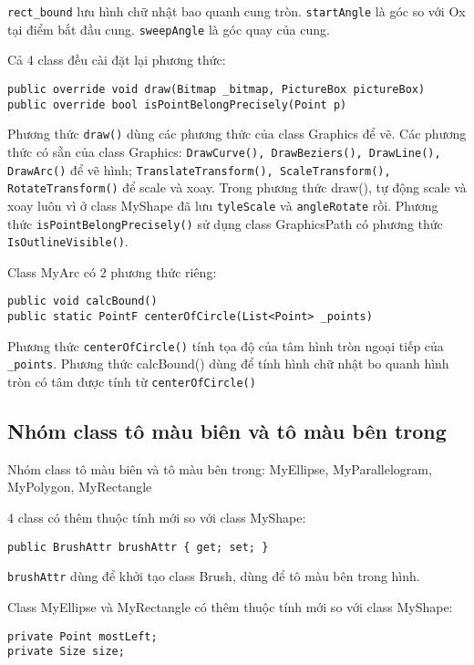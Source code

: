 \documentclass[12pt]{article}
\begin{document}
\texttt{rect\_bound} lưu hình chữ nhật bao quanh cung tròn.
\texttt{startAngle} là góc so với Ox tại điểm bắt đầu cung.
\texttt{sweepAngle} là góc quay của cung.

Cả 4 class đều cài đặt lại phương thức:
\begin{lstlisting}
public override void draw(Bitmap _bitmap, PictureBox pictureBox)
public override bool isPointBelongPrecisely(Point p)
\end{lstlisting}

Phương thức \texttt{draw()} dùng các phương thức của class Graphics để vẽ.
Các phương thức có sẵn của class Graphics: \texttt{DrawCurve(), DrawBeziers(), DrawLine(), DrawArc()} để vẽ hình;
\texttt{TranslateTransform(), ScaleTransform(), RotateTransform()} để scale và xoay. Trong phương thức draw(),
tự động scale và xoay luôn vì ở class MyShape đã lưu \texttt{tyleScale} và \texttt{angleRotate} rồi.
Phương thức \texttt{isPointBelongPrecisely()} sử dụng class GraphicsPath có phương thức \texttt{IsOutlineVisible()}.

Class MyArc có 2 phương thức riêng:
\begin{lstlisting}
public void calcBound()
public static PointF centerOfCircle(List<Point> _points)
\end{lstlisting}

Phương thức \texttt{centerOfCircle()} tính tọa độ của tâm hình tròn ngoại tiếp của \texttt{\_points}.
Phương thức calcBound() dùng để tính hình chữ nhật bo quanh hình tròn có tâm được tính từ \texttt{centerOfCircle()}

\subsection{Nhóm class tô màu biên và tô màu bên trong}
Nhóm class tô màu biên và tô màu bên trong: MyEllipse, MyParallelogram, MyPolygon, MyRectangle

4 class có thêm thuộc tính mới so với class MyShape:
\begin{lstlisting}
public BrushAttr brushAttr { get; set; }
\end{lstlisting}

\texttt{brushAttr} dùng để khởi tạo class Brush, dùng để tô màu bên trong hình.

Class MyEllipse và MyRectangle có thêm thuộc tính mới so với class MyShape:
\begin{lstlisting}
private Point mostLeft;
private Size size;
\end{lstlisting}
\end{document}
